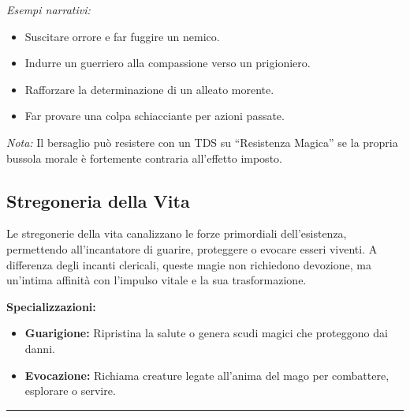 \documentclass[./magie.tex]{subfiles}
\begin{document}
\textit{Esempi narrativi:}
\begin{itemize}
\item Suscitare orrore e far fuggire un nemico.
\item Indurre un guerriero alla compassione verso un prigioniero.
\item Rafforzare la determinazione di un alleato morente.
\item Far provare una colpa schiacciante per azioni passate.
\end{itemize}

\textit{Nota:} Il bersaglio può resistere con un TDS su “Resistenza Magica” se la propria bussola morale è fortemente contraria all’effetto imposto.

\clearpage
\vspace{0.2cm}
\subsection{Stregoneria della Vita}

Le stregonerie della vita canalizzano le forze primordiali dell’esistenza, permettendo all’incantatore di guarire, proteggere o evocare esseri viventi. A differenza degli incanti clericali, queste magie non richiedono devozione, ma un’intima affinità con l’impulso vitale e la sua trasformazione.

\textbf{Specializzazioni:}
\begin{itemize}
\item \textbf{Guarigione:} Ripristina la salute o genera scudi magici che proteggono dai danni.
\item \textbf{Evocazione:} Richiama creature legate all’anima del mago per combattere, esplorare o servire.
\end{itemize}

\vspace{0.2cm}
\noindent
\begin{center}
\rule{\textwidth}{0.4pt} 
\end{center}
\vspace{0.2cm}
\end{document}
